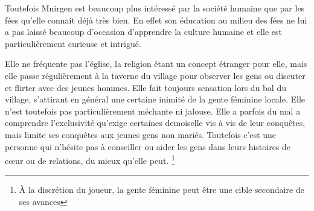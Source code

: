 Toutefois Muirgen est beaucoup plus intéressé par la société humaine que par les fées qu'elle connait déjà très bien. En effet son éducation au milieu des fées ne lui a pas laissé beaucoup d'occasion d'apprendre la culture humaine et elle est particulièrement curieuse et intrigué.

Elle ne fréquente pas l'église, la religion étant un concept étranger pour elle, mais elle passe régulièrement à la taverne du village pour observer les gens ou discuter et flirter avec des jeunes hommes. Elle fait toujours sensation lors du bal du village, s'attirant en général une certaine inimité de la gente féminine locale. Elle n'est toutefois pas particulièrement méchante ni jalouse. Elle a parfois du mal a comprendre l'exclusivité qu'exige certaines demoiselle vis à vis de leur conquêtes, mais limite ses conquêtes aux jeunes gens non mariés. Toutefois c'est une personne qui n'hésite pas à conseiller ou aider les gens dans leurs histoires de cœur ou de relations, du mieux qu'elle peut. \footnote{À la discrétion du joueur, la gente féminine peut être une cible secondaire de ses avances}



